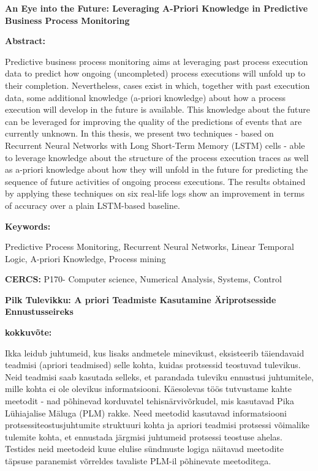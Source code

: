 
\noindent
{\large \textbf{An Eye into the Future: Leveraging A-Priori Knowledge in Predictive Business Process Monitoring}}

\vspace{4mm}
\noindent
\textbf{Abstract:}
\par
\noindent
Predictive business process monitoring aims at leveraging past process execution data to predict how ongoing (uncompleted) process executions will unfold up to
their completion.
Nevertheless, cases exist in which, together with past
execution data, some additional knowledge (a-priori
knowledge) about how a process execution will develop in the future is available. This knowledge about the future can be leveraged for
improving the quality of the predictions of events that are currently unknown. In this thesis, we present two
techniques - based on Recurrent Neural Networks with Long Short-Term Memory (LSTM) cells - able to
leverage knowledge about the structure of the process execution traces as well as a-priori knowledge about how they will unfold in the future for predicting the sequence of future activities of ongoing process executions. The results obtained by applying these techniques on six real-life logs show an improvement in terms of accuracy over a plain
LSTM-based baseline.

\par
\vspace{4mm}
\noindent
\textbf{Keywords:} 
\par 
\noindent
Predictive Process Monitoring, Recurrent Neural Networks, Linear Temporal Logic, A-priori Knowledge, Process mining


\par
\vspace{4mm}
\noindent
\textbf{CERCS:} P170- Computer science, Numerical Analysis, Systems, Control


\vspace{4mm}
\noindent
{\large \textbf{Pilk Tulevikku: A priori Teadmiste Kasutamine Äriprotsesside Ennustusseireks}}

\vspace{4mm}
\noindent
\textbf{kokkuvõte:}
\par
\noindent
Ikka leidub juhtumeid, kus lisaks andmetele minevikust, eksisteerib täiendavaid teadmisi (apriori teadmised) selle kohta, kuidas protsessid teostuvad tulevikus. Neid teadmisi saab kasutada selleks, et parandada tuleviku ennustusi juhtumitele, mille kohta ei ole olevikus informatsiooni. Käesolevas töös tutvustame kahte meetodit - nad põhinevad korduvatel tehisnärvivõrkudel, mis kasutavad Pika Lühiajalise Mäluga (PLM) rakke. Need meetodid kasutavad informatsiooni protsessiteostusjuhtumite struktuuri kohta ja apriori teadmisi protsessi võimalike tulemite kohta, et ennustada järgmisi juhtumeid protsessi teostuse ahelas. Testides neid meetodeid kuue elulise sündmuste logiga näitavad meetodite täpsuse paranemist võrreldes tavaliste PLM-il põhinevate meetoditega.

